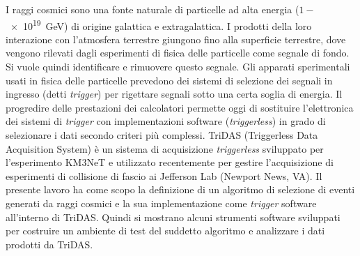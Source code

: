 \documentclass[../main.tex]{subfiles}
\begin{document}
I raggi cosmici sono una fonte naturale di particelle ad alta energia ($1 - $\SI{e19}{\GeV}) di origine galattica e extragalattica. 
I prodotti della loro interazione con l'atmosfera terrestre giungono fino alla superficie terrestre, dove vengono rilevati dagli esperimenti di fisica delle particelle come segnale di fondo. 
Si vuole quindi identificare e rimuovere questo segnale.
Gli apparati sperimentali usati in fisica delle particelle prevedono dei sistemi di selezione dei segnali in ingresso (detti \emph{trigger}) per rigettare segnali sotto una certa soglia di energia. 
Il progredire delle prestazioni dei calcolatori permette oggi di sostituire l'elettronica dei sistemi di \emph{trigger} con implementazioni software (\emph{triggerless}) in grado di selezionare i dati secondo criteri più complessi.
TriDAS (Triggerless Data Acquisition System) è un sistema di acquisizione \emph{triggerless} sviluppato per l'esperimento KM3NeT e utilizzato recentemente per gestire l'acquisizione di esperimenti di collisione di fascio ai Jefferson Lab (Newport News, VA). 
Il presente lavoro ha come scopo la definizione di un algoritmo di selezione di eventi generati da raggi cosmici e la sua implementazione come \emph{trigger} software all'interno di TriDAS.
Quindi si mostrano alcuni strumenti software sviluppati per costruire un ambiente di test del suddetto algoritmo e analizzare i dati prodotti da TriDAS. 
\end{document}

